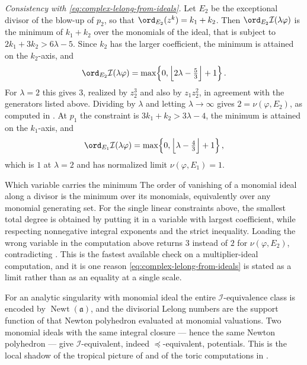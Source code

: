 \begin{example}
\emph{Consistency with \eqref{eq:complex-lelong-from-ideals}.}  Let
$E_2$ be the exceptional divisor of the blow-up of $p_2$, so that
$\ord_{E_2}(z^k)=k_1+k_2$.  Then
$\ord_{E_2}\mathcal I(\lambda\varphi)$ is the minimum of $k_1+k_2$
over the monomials of the ideal, that is subject to
$2k_1+3k_2>6\lambda-5$.  Since $k_2$ has the larger coefficient, the
minimum is attained on the $k_2$-axis, and
\[
 \ord_{E_2}\mathcal I(\lambda\varphi)
 =\max\!\left\{0,\Bigl\lfloor2\lambda-\tfrac53\Bigr\rfloor+1\right\} .
\]
For $\lambda=2$ this gives $3$, realized by $z_2^3$ and also by
$z_1z_2^2$, in agreement with the generators listed above.  Dividing by
$\lambda$ and letting $\lambda\to\infty$ gives $2=\nu(\varphi,E_2)$,
as computed in .  At $p_1$ the constraint is
$3k_1+k_2>3\lambda-4$, the minimum is attained on the $k_1$-axis, and
\[
 \ord_{E_1}\mathcal I(\lambda\varphi)
 =\max\!\left\{0,\Bigl\lfloor\lambda-\tfrac43\Bigr\rfloor+1\right\} ,
\]
which is $1$ at $\lambda=2$ and has normalized limit
$\nu(\varphi,E_1)=1$.
\end{example}

\begin{warning}{Which variable carries the minimum}
\label{warn:ch51-ord-monomial}
The order of vanishing of a monomial ideal along a divisor is the minimum
over its monomials, equivalently over any monomial generating set.
For the single linear constraints above, the smallest total degree is
obtained by putting it in a variable with largest coefficient, while
respecting nonnegative integral exponents and the strict inequality.  Loading the wrong variable in the
computation above returns $3$ instead of $2$ for
$\nu(\varphi,E_2)$, contradicting .  This is the
fastest available check on a multiplier-ideal computation, and it is one
reason \eqref{eq:complex-lelong-from-ideals} is stated as a limit rather
than as an equality at a single scale.
\end{warning}

\begin{remark}
\label{rem:ch51-newton}
For an analytic singularity with monomial ideal the entire
$\mathcal I$-equivalence class is encoded by
$\operatorname{Newt}(\mathfrak a)$, and the divisorial Lelong numbers
are the support function of that Newton polyhedron evaluated at monomial
valuations.  Two monomial ideals with the same integral closure --- hence
the same Newton polyhedron --- give $\mathcal I$-equivalent, indeed
$\preceq$-equivalent, potentials.  This is the local shadow of the
tropical picture of  and of the toric
computations in .
\end{remark}


